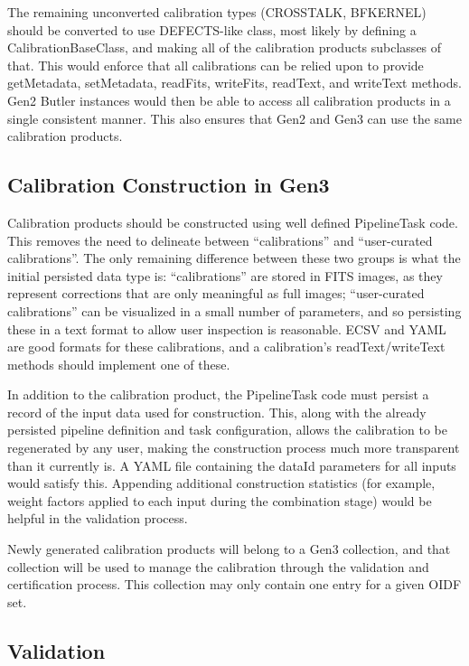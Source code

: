 \documentclass[DM,authoryear,toc]{lsstdoc}
\begin{document}
The remaining unconverted calibration types (CROSSTALK, BFKERNEL)
should be converted to use DEFECTS-like class, most likely by defining
a CalibrationBaseClass, and making all of the calibration products
subclasses of that.  This would enforce that all calibrations can be
relied upon to provide getMetadata, setMetadata, readFits, writeFits,
readText, and writeText methods.  Gen2 Butler instances would then be
able to access all calibration products in a single consistent manner.
This also ensures that Gen2 and Gen3 can use the same calibration
products.

\subsection{Calibration Construction in Gen3}

Calibration products should be constructed using well defined
PipelineTask code.  This removes the need to delineate between
``calibrations'' and ``user-curated calibrations''.  The only
remaining difference between these two groups is what the initial
persisted data type is: ``calibrations'' are stored in FITS images, as
they represent corrections that are only meaningful as full images;
``user-curated calibrations'' can be visualized in a small number of
parameters, and so persisting these in a text format to allow user
inspection is reasonable.  ECSV and YAML are good formats for these
calibrations, and a calibration's readText/writeText methods should
implement one of these.

In addition to the calibration product, the PipelineTask code must
persist a record of the input data used for construction.  This, along
with the already persisted pipeline definition and task configuration,
allows the calibration to be regenerated by any user, making the
construction process much more transparent than it currently is.  A
YAML file containing the dataId parameters for all inputs would
satisfy this.  Appending additional construction statistics (for
example, weight factors applied to each input during the combination
stage) would be helpful in the validation process.

Newly generated calibration products will belong to a Gen3 collection,
and that collection will be used to manage the calibration through the
validation and certification process.  This collection may only
contain one entry for a given OIDF set.

\subsection{Validation}
\end{document}
